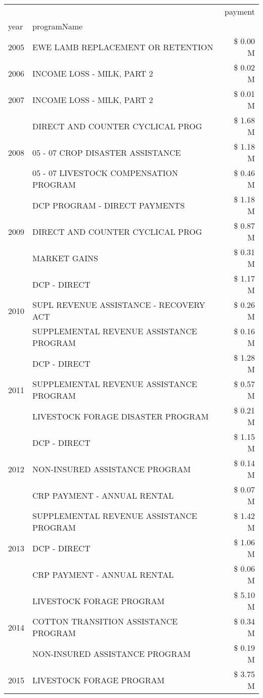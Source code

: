 \begin{tabular}{llr}
\toprule
 &  & payment \\
year & programName &  \\
\midrule
2005 & EWE LAMB REPLACEMENT OR RETENTION & \$ 0.00 M \\
\cline{1-3}
2006 & INCOME LOSS - MILK, PART 2 & \$ 0.02 M \\
\cline{1-3}
2007 & INCOME LOSS - MILK, PART 2 & \$ 0.01 M \\
\cline{1-3}
\multirow[t]{3}{*}{2008} & DIRECT AND COUNTER CYCLICAL PROG & \$ 1.68 M \\
 & 05 - 07 CROP DISASTER ASSISTANCE & \$ 1.18 M \\
 & 05 - 07 LIVESTOCK COMPENSATION PROGRAM & \$ 0.46 M \\
\cline{1-3}
\multirow[t]{3}{*}{2009} & DCP PROGRAM - DIRECT PAYMENTS & \$ 1.18 M \\
 & DIRECT AND COUNTER CYCLICAL PROG & \$ 0.87 M \\
 & MARKET GAINS & \$ 0.31 M \\
\cline{1-3}
\multirow[t]{3}{*}{2010} & DCP - DIRECT & \$ 1.17 M \\
 & SUPL REVENUE ASSISTANCE - RECOVERY ACT & \$ 0.26 M \\
 & SUPPLEMENTAL REVENUE ASSISTANCE PROGRAM & \$ 0.16 M \\
\cline{1-3}
\multirow[t]{3}{*}{2011} & DCP - DIRECT & \$ 1.28 M \\
 & SUPPLEMENTAL REVENUE ASSISTANCE PROGRAM & \$ 0.57 M \\
 & LIVESTOCK FORAGE DISASTER PROGRAM & \$ 0.21 M \\
\cline{1-3}
\multirow[t]{3}{*}{2012} & DCP - DIRECT & \$ 1.15 M \\
 & NON-INSURED ASSISTANCE PROGRAM & \$ 0.14 M \\
 & CRP PAYMENT - ANNUAL RENTAL & \$ 0.07 M \\
\cline{1-3}
\multirow[t]{3}{*}{2013} & SUPPLEMENTAL REVENUE ASSISTANCE PROGRAM & \$ 1.42 M \\
 & DCP - DIRECT & \$ 1.06 M \\
 & CRP PAYMENT - ANNUAL RENTAL & \$ 0.06 M \\
\cline{1-3}
\multirow[t]{3}{*}{2014} & LIVESTOCK FORAGE PROGRAM & \$ 5.10 M \\
 & COTTON TRANSITION ASSISTANCE PROGRAM & \$ 0.34 M \\
 & NON-INSURED ASSISTANCE PROGRAM & \$ 0.19 M \\
\cline{1-3}
\multirow[t]{3}{*}{2015} & LIVESTOCK FORAGE PROGRAM & \$ 3.75 M \\

\end{tabular}
